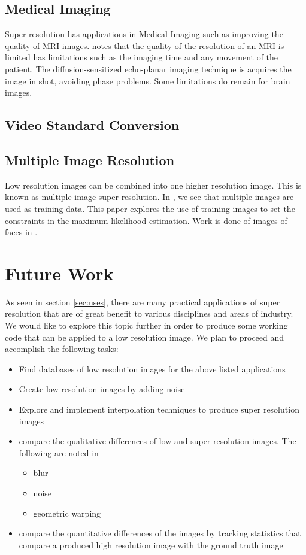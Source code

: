 \documentclass{article}
\begin{document}
\subsection{Medical Imaging}
Super resolution has applications in Medical Imaging such as improving
the quality of MRI images. \cite{Peled} notes that the quality of the resolution of
an MRI is limited has limitations such as the imaging time and any
movement of the patient. The diffusion-sensitized echo-planar imaging
technique is acquires the image in shot, avoiding phase problems. Some
limitations do remain for brain images.  

\subsection{Video Standard Conversion}

\subsection{Multiple Image Resolution}
Low resolution images can be combined into one higher resolution
image. This is known as multiple image super resolution. In
\cite{CapelMulti}, we see that multiple images are used as training
data. This paper explores the use of training images
to set the constraints in the maximum likelihood estimation. Work is done of images of faces in \cite{CapelMulti}.
 
\section{Future Work}
\label{sec:future}
As seen in section \ref{sec:uses}, there are many practical
applications of super resolution that are of great benefit to various
disciplines and areas of industry. We would like to explore this topic
further in order to produce some working code that can be applied to a low
resolution image. We plan to proceed and accomplish the following
tasks:
\begin{itemize}
\item Find databases of low resolution images for the
  above listed applications
  \item Create low resolution images by adding noise
  \item Explore and implement interpolation techniques to produce
    super resolution images
    \item compare the qualitative differences of low and super
      resolution images. The following are noted in \cite{CapelMulti}
      \begin{itemize}
      \item blur
      \item  noise
      \item geometric warping
        
        \end{itemize}
      \item compare the quantitative differences of the images by
        tracking statistics that compare a produced high resolution image with
        the ground truth image 
\end{itemize}


\newpage
\printbibliography
\end{document}
